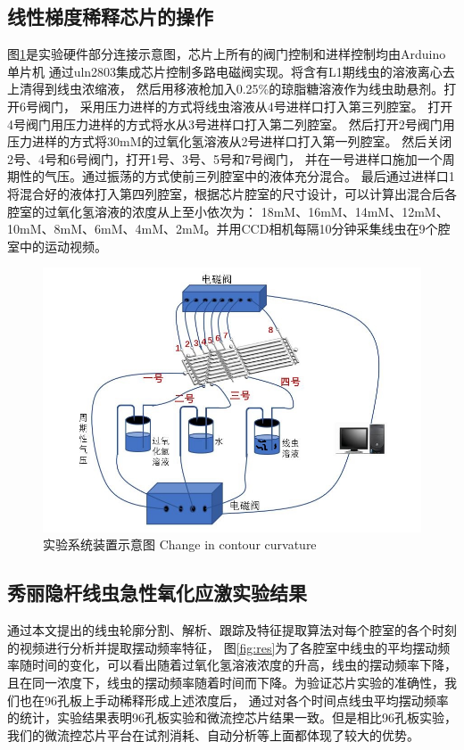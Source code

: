 \subsection{线性梯度稀释芯片的操作}
	图\ref{fig:sysdevice}是实验硬件部分连接示意图，芯片上所有的阀门控制和进样控制均由Arduino单片机
	通过uln2803集成芯片控制多路电磁阀实现。将含有L1期线虫的溶液离心去上清得到线虫浓缩液，
	然后用移液枪加入0.25\%的琼脂糖溶液作为线虫助悬剂。打开6号阀门，
	采用压力进样的方式将线虫溶液从4号进样口打入第三列腔室。
	打开4号阀门用压力进样的方式将水从3号进样口打入第二列腔室。
	然后打开2号阀门用压力进样的方式将30mM的过氧化氢溶液从2号进样口打入第一列腔室。
	然后关闭2号、4号和6号阀门，打开1号、3号、5号和7号阀门，
	并在一号进样口施加一个周期性的气压。通过振荡的方式使前三列腔室中的液体充分混合。
	最后通过进样口1将混合好的液体打入第四列腔室，根据芯片腔室的尺寸设计，可以计算出混合后各腔室的过氧化氢溶液的浓度从上至小依次为：
	18mM、16mM、14mM、12mM、10mM、8mM、6mM、4mM、2mM。并用CCD相机每隔10分钟采集线虫在9个腔室中的运动视频。
	\begin{figure}[h]
	  \centering
	  \includegraphics[width=12cm]{figure/chap5/hardware.jpg}
	  \bicaption
		{实验系统装置示意图}
		{Change in contour curvature}
	  \label{fig:sysdevice}
	\end{figure}
\subsection{秀丽隐杆线虫急性氧化应激实验结果}
	通过本文提出的线虫轮廓分割、解析、跟踪及特征提取算法对每个腔室的各个时刻的视频进行分析并提取摆动频率特征，
	图\ref{fig:res}为了各腔室中线虫的平均摆动频率随时间的变化，可以看出随着过氧化氢溶液浓度的升高，线虫的摆动频率下降，
	且在同一浓度下，线虫的摆动频率随着时间而下降。为验证芯片实验的准确性，我们也在96孔板上手动稀释形成上述浓度后，
	通过对各个时间点线虫平均摆动频率的统计，实验结果表明96孔板实验和微流控芯片结果一致。但是相比96孔板实验，
	我们的微流控芯片平台在试剂消耗、自动分析等上面都体现了较大的优势。
	
